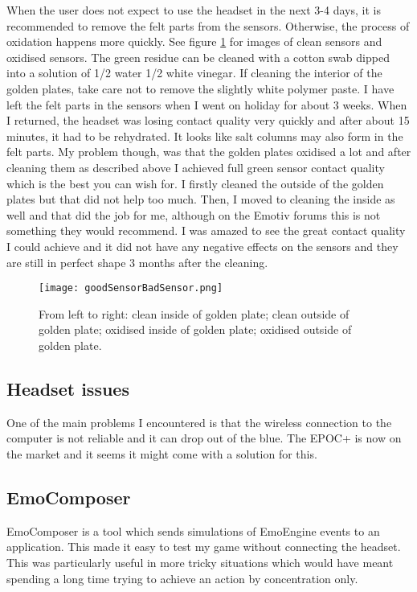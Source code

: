 When the user does not expect to use the headset in the next 3-4 days, it is recommended to remove the felt parts from the sensors. Otherwise, the process of oxidation happens more quickly. See figure \ref{fig:cleanVsOxidised} for images of clean sensors and oxidised sensors. The green residue can be cleaned with a cotton swab dipped into a solution of 1/2 water 1/2 white vinegar. If cleaning the interior of the golden plates, take care not to remove the slightly white polymer paste. I have left the felt parts in the sensors when I went on holiday for about 3 weeks. When I returned, the headset was losing contact quality very quickly and after about 15 minutes, it had to be rehydrated. It looks like salt columns may also form in the felt parts. My problem though, was that the golden plates oxidised a lot and after cleaning them as described above I achieved full green sensor contact quality which is the best you can wish for. I firstly cleaned the outside of the golden plates but that did not help too much. Then, I moved to cleaning the inside as well and that did the job for me, although on the Emotiv forums this is not something they would recommend. I was amazed to see the great contact quality I could achieve and it did not have any negative effects on the sensors and they are still in perfect shape 3 months after the cleaning.

\begin{figure}
  \centering
  \texttt{[image: goodSensorBadSensor.png]}
  \caption{From left to right: clean inside of golden plate; clean outside of golden plate; oxidised inside of golden plate; oxidised outside of golden plate.}
    \label{fig:cleanVsOxidised}           
\end{figure}

\subsection{Headset issues}
One of the main problems I encountered is that the wireless connection to the computer is not reliable and it can drop out of the blue. The EPOC+ is now on the market and it seems it might come with a solution for this.

\subsection{EmoComposer}
\label{part:emocomposer}
EmoComposer is a tool which sends simulations of EmoEngine events to an application. This made it easy to test my game without connecting the headset. This was particularly useful in more tricky situations which would have meant spending a long time trying to achieve an action by concentration only.


